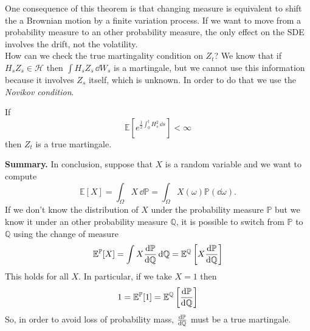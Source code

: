 One consequence of this theorem is that changing measure is equivalent to shift the a Brownian motion by a finite variation process. If we want to move from a probability measure to an other probability measure, the only effect on the SDE involves the drift, not the volatility.\\
How can we check the true martingality condition on $Z_t$? We know that if $H_sZ_s\in\mathcal{H}$ then $\int H_sZ_s\,\dd W_s$ is a martingale, but we cannot use this information because it involves $Z_s$ itself, which is unknown. In order to do that we use the \emph{Novikov condition}.
\begin{lemma}
    If 
    \begin{equation}
        \mathbb{E}\left[e^{\frac{1}{2}\int^t_0 H_s^2\,\dd s}\right]<\infty
    \end{equation}    
    then $Z_t$ is a true martingale.
\end{lemma}
\textbf{Summary.} In conclusion, suppose that $X$ is a random variable and we want to compute 
\begin{equation*}
    \mathbb{E}[X] = \int_{\Omega}X\,\dd\mathbb{P} = \int_{\Omega}X(\omega)\mathbb{P}(\dd\omega).
\end{equation*}
If we don't know the distribution of $X$ under the probability measure $\mathbb{P}$ but we know it under an other probability measure $\mathbb{Q}$, it is possible to switch from $\mathbb{P}$ to $\mathbb{Q}$ using the change of measure
\begin{equation*}
    \mathbb{E}^{\mathbb{P}}[X] = \int X\dv{\mathbb{P}}{\mathbb{Q}}\,\dd\mathbb{Q} = \mathbb{E}^{\mathbb{Q}}\left[X\dv{\mathbb{P}}{\mathbb{Q}}\right]
\end{equation*}
This holds for all $X$. In particular, if we take $X=1$ then
\begin{equation*}
    1 = \mathbb{E}^{\mathbb{P}}[1] = \mathbb{E}^{\mathbb{Q}}\left[\dv{\mathbb{P}}{\mathbb{Q}}\right]
\end{equation*}
So, in order to avoid loss of probability mass, $\dv{\mathbb{P}}{\mathbb{Q}}$ must be a true martingale.